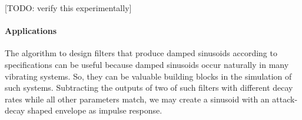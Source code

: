 [TODO: verify this experimentally]


\paragraph{Applications}
The algorithm to design filters that produce damped sinusoids according to specifications can be useful because damped sinusoids occur naturally in many vibrating systems. So, they can be valuable building blocks in the simulation of such systems. Subtracting the outputs of two of such filters with different decay rates while all other parameters match, we may create a sinusoid with an attack-decay shaped envelope as impulse response.



